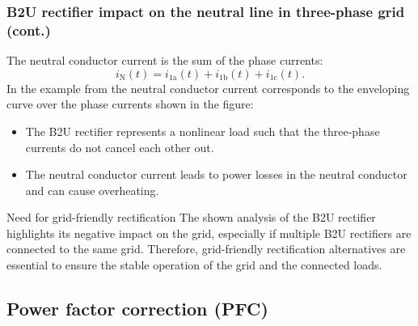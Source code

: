\begin{frame}
	\frametitle{B2U rectifier impact on the neutral line in three-phase grid (cont.)}
	The neutral conductor current is the sum of the phase currents:
	\begin{equation}
		i_{\mathrm{N}}(t) = i_{1\mathrm{a}}(t) + i_{1\mathrm{b}}(t) + i_{1\mathrm{c}}(t).
	\end{equation}\pause
	In the example from  the neutral conductor current corresponds to the enveloping curve over the phase currents shown in the figure:
	\begin{itemize}
		\item The B2U rectifier represents a nonlinear load such that the three-phase currents do not cancel each other out.\pause
		\item The neutral conductor current leads to power losses in the neutral conductor and can cause overheating.\pause
	\end{itemize}
	\vspace{-0.5cm}
	\begin{varblock}{Need for grid-friendly rectification}
		The shown analysis of the B2U rectifier highlights its negative impact on the grid, especially if multiple B2U rectifiers are connected to the same grid. Therefore, grid-friendly rectification alternatives are essential to ensure the stable operation of the grid and the connected loads.
	\end{varblock}
\end{frame}

\subsection{Power factor correction (PFC)}

